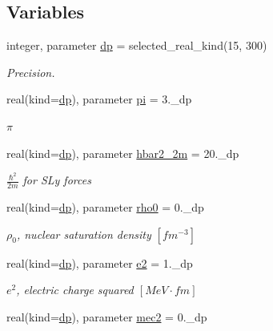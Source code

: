 \subsection*{Variables}
\begin{DoxyCompactItemize}
\item 
integer, parameter \mbox{\hyperlink{namespaceparameters_a52f8c6351fd79345d8811e065bcbbb37}{dp}} = selected\+\_\+real\+\_\+kind(15, 300)
\begin{DoxyCompactList}\small\item\em Precision. \end{DoxyCompactList}\item 
real(kind=\mbox{\hyperlink{namespaceparameters_a52f8c6351fd79345d8811e065bcbbb37}{dp}}), parameter \mbox{\hyperlink{group__CONSTANTS_ga399aac088b57a76a8a5a3784448ba3cf}{pi}} = 3.\+\_\+dp
\begin{DoxyCompactList}\small\item\em $\pi$ \end{DoxyCompactList}\item 
real(kind=\mbox{\hyperlink{namespaceparameters_a52f8c6351fd79345d8811e065bcbbb37}{dp}}), parameter \mbox{\hyperlink{group__CONSTANTS_gad4b06975615fad2c991376a975fd08f1}{hbar2\+\_\+2m}} = 20.\+\_\+dp
\begin{DoxyCompactList}\small\item\em $\frac{\hbar^2}{2m}$ for S\+Ly forces \end{DoxyCompactList}\item 
real(kind=\mbox{\hyperlink{namespaceparameters_a52f8c6351fd79345d8811e065bcbbb37}{dp}}), parameter \mbox{\hyperlink{group__CONSTANTS_ga0796781a51dc993c4b563f7ac404c641}{rho0}} = 0.\+\_\+dp
\begin{DoxyCompactList}\small\item\em $\rho_0$, nuclear saturation density $[fm^{-3}]$ \end{DoxyCompactList}\item 
real(kind=\mbox{\hyperlink{namespaceparameters_a52f8c6351fd79345d8811e065bcbbb37}{dp}}), parameter \mbox{\hyperlink{group__CONSTANTS_gaafa6a6262bc00c89fb3d403241497d22}{e2}} = 1.\+\_\+dp
\begin{DoxyCompactList}\small\item\em $e^2$, electric charge squared $[MeV\cdot fm]$ \end{DoxyCompactList}\item 
real(kind=\mbox{\hyperlink{namespaceparameters_a52f8c6351fd79345d8811e065bcbbb37}{dp}}), parameter \mbox{\hyperlink{group__CONSTANTS_ga8b91e60e1e7c4b066cc282415c740bc9}{mec2}} = 0.\+\_\+dp

\end{DoxyCompactItemize}
